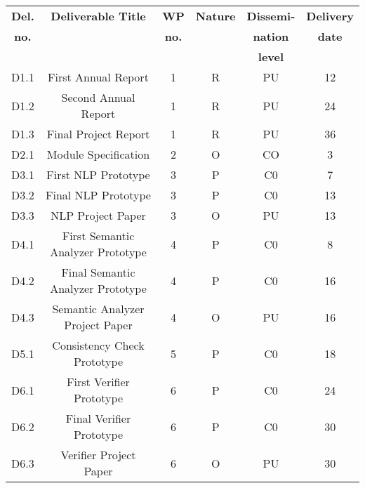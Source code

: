 \begin{center}
	\begin{adjustbox}{width=1\textwidth}
			\begin{tabular}{ |c|c|c|c|c|c|} 
			\hline
			\textbf{Del.} & \textbf{Deliverable Title} & \textbf{WP} & \textbf{Nature} & \textbf{Dissemi-} & \textbf{Delivery} \\
			\textbf{no.} & \textbf{~} & \textbf{no.} & ~ & \textbf{nation} & \textbf{date}  \\
			~ & ~ & ~ & ~ & \textbf{level} & ~  \\
			\hline
			
			D1.1 & First Annual Report & 1 & R & PU & 12\\
			\hline
			
			D1.2 & Second Annual Report & 1 & R & PU & 24\\
			\hline
			
			D1.3 & Final Project Report & 1 & R & PU & 36\\
			\hline
			
			D2.1 & Module Specification & 2 & O & CO & 3\\
			\hline
			
			D3.1 & First NLP Prototype & 3 & P & C0 & 7\\
			\hline
			
			D3.2 & Final NLP Prototype & 3 & P & C0 & 13\\
			\hline
			
			D3.3 & NLP Project Paper & 3 & O & PU & 13\\
			\hline
			
			D4.1 & First Semantic Analyzer Prototype & 4 & P & C0 & 8\\
			\hline
			
			D4.2 & Final Semantic Analyzer Prototype & 4 & P & C0 & 16\\
			\hline
			
			D4.3 & Semantic Analyzer Project Paper & 4 & O & PU & 16\\
			\hline
			
			D5.1 & Consistency Check Prototype & 5 & P & C0 & 18\\
			\hline
			
			D6.1 & First Verifier Prototype & 6 & P & C0 & 24\\
			\hline
			
			D6.2 & Final Verifier Prototype & 6 & P & C0 & 30\\
			\hline
			
			D6.3 & Verifier Project Paper & 6 & O & PU & 30\\
			\hline
			

\end{tabular}
\end{adjustbox}
\end{center}
